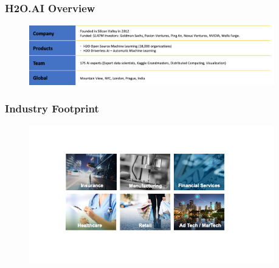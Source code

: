 \documentclass[11pt,
               aspectratio=169,
               hyperref={colorlinks}
               ]{beamer}
\begin{document}
	\begin{frame}
		\frametitle{H2O.AI Overview}
		\begin{figure}[htb]
			\begin{center}
				\includegraphics[width=0.95\textwidth]{img/team.png}
				\label{fig:team}
			\end{center}
		\end{figure}
	\end{frame}
	\begin{frame}
		\frametitle{Industry Footprint}
		\begin{figure}[htb]
			\begin{center}
				\includegraphics[width=0.95\textwidth]{img/industry.png}
				\label{fig:industry}
			\end{center}
		\end{figure}
	\end{frame}
\end{document}
